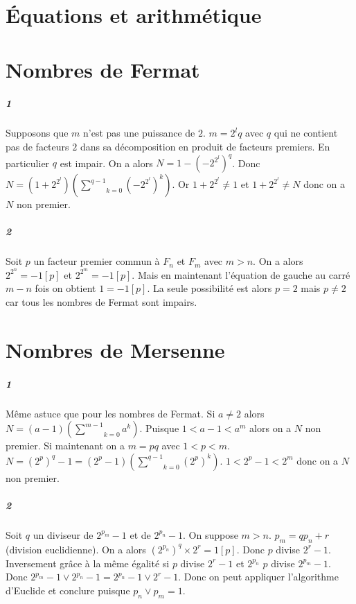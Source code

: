 \documentclass[10pt,a4paper]{article}
\begin{document}
\section{Équations et arithmétique}
\section{Nombres de Fermat}
\subparagraph{1}Supposons que $m$ n'est pas une puissance de $2$. $m=2^lq$ avec $q$ qui ne contient pas de facteurs $2$ dans sa décomposition en produit de facteurs premiers. En particulier $q$ est impair. On a alors $N=1-(-2^{2^l})^q$. Donc $N=\left( 1+2^{2^l} \right) \left( \underset{k=0}{\overset{q-1}{\sum}} (-2^{2^l})^k\right)$. Or $1+2^{2^l} \neq 1$ et $1+2^{2^l} \neq N$ donc on a $N$ non premier.
\subparagraph{2}Soit $p$ un facteur premier commun à $F_n$ et $F_m$ avec $m >n$. On a alors $2^{2^n}=-1 [p]$ et $2^{2^m}=-1 [p]$. Mais en maintenant l'équation de gauche au carré $m-n$ fois on obtient $1=-1[p]$. La seule possibilité est alors $p=2$ mais $p \neq 2$ car tous les nombres de Fermat sont impairs.
\section{Nombres de Mersenne}
\subparagraph{1}Même astuce que pour les nombres de Fermat. Si $a \neq 2$ alors $N=(a-1)\left( \underset{k=0}{\overset{m-1}{\sum}} a^k\right)$. Puisque $1<a-1<a^m$ alors on a $N$ non premier. Si maintenant on a $m=pq$ avec $1<p<m$. $N=(2^p)^q-1=(2^p-1) \left( \underset{k=0}{\overset{q-1}{\sum}} (2^p)^k \right)$. $1 < 2^p -1 < 2^m$ donc on a $N$ non premier.
\subparagraph{2}Soit $q$ un diviseur de $2^{p_m}-1$ et de $2^{p_n}-1$. On suppose $m>n$. $p_m=qp_n+r$ (division euclidienne). On a alors $(2^{p_n})^q \times 2^r=1[p]$. Donc $p$ divise $2^r-1$. Inversement grâce à la même égalité si $p$ divise $2^r-1$ et $2^{p_n}$ $p$ divise $2^{p_m}-1$. Donc $2^{p_m}-1 \vee 2^{p_n}-1 = 2^{p_n}-1 \vee 2^r-1$. Donc on peut appliquer l'algorithme d'Euclide et conclure puisque $p_n \vee p_m=1$.
\end{document}
